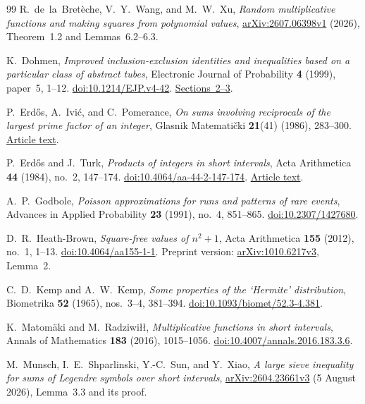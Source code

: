 \begin{thebibliography}{99}
R.~de~la~Bret\`eche, V.~Y.~Wang, and M.~W.~Xu,
\emph{Random multiplicative functions and making squares from
polynomial values},
\href{https://arxiv.org/abs/2607.06398v1}
{arXiv:2607.06398v1} (2026), Theorem~1.2 and
Lemmas~6.2--6.3.

K.~Dohmen,
\emph{Improved inclusion-exclusion identities and inequalities
based on a particular class of abstract tubes},
Electronic Journal of Probability \textbf{4} (1999), paper~5,
1--12.
\href{https://doi.org/10.1214/EJP.v4-42}
{doi:10.1214/EJP.v4-42}.
\href{https://www.maths.tcd.ie/EMIS/journals/EJP-ECP/article/download/42/42-83-1-PB.pdf}
{Sections~2--3}.

P.~Erd\H{o}s, A.~Ivi\'c, and C.~Pomerance,
\emph{On sums involving reciprocals of the largest
prime factor of an integer},
Glasnik Matemati\v{c}ki \textbf{21}(41) (1986), 283--300.
\href{https://www.renyi.hu/~p_erdos/1986-10.pdf}
{Article text}.

P.~Erd\H{o}s and J.~Turk,
\emph{Products of integers in short intervals},
Acta Arithmetica \textbf{44} (1984), no.~2, 147--174.
\href{https://doi.org/10.4064/aa-44-2-147-174}
{doi:10.4064/aa-44-2-147-174}.
\href{https://www.renyi.hu/~p_erdos/1984-17.pdf}
{Article text}.

A.~P.~Godbole,
\emph{Poisson approximations for runs and patterns of rare events},
Advances in Applied Probability \textbf{23} (1991), no.~4,
851--865.
\href{https://doi.org/10.2307/1427680}
{doi:10.2307/1427680}.

D.~R.~Heath-Brown,
\emph{Square-free values of \(n^2+1\)},
Acta Arithmetica \textbf{155} (2012), no.~1, 1--13.
\href{https://doi.org/10.4064/aa155-1-1}
{doi:10.4064/aa155-1-1}.
Preprint version:
\href{https://arxiv.org/abs/1010.6217v3}
{arXiv:1010.6217v3}, Lemma~2.

C.~D.~Kemp and A.~W.~Kemp,
\emph{Some properties of the `Hermite' distribution},
Biometrika \textbf{52} (1965), nos.~3--4, 381--394.
\href{https://doi.org/10.1093/biomet/52.3-4.381}
{doi:10.1093/biomet/52.3-4.381}.

K.~Matom\"aki and M.~Radziwi{\l}{\l},
\emph{Multiplicative functions in short intervals},
Annals of Mathematics \textbf{183} (2016), 1015--1056.
\href{https://doi.org/10.4007/annals.2016.183.3.6}
{doi:10.4007/annals.2016.183.3.6}.

M.~Munsch, I.~E.~Shparlinski, Y.-C.~Sun, and Y.~Xiao,
\emph{A large sieve inequality for sums of Legendre symbols
over short intervals},
\href{https://arxiv.org/abs/2604.23661v3}
{arXiv:2604.23661v3} (5 August 2026), Lemma~3.3 and its proof.


\end{thebibliography}
